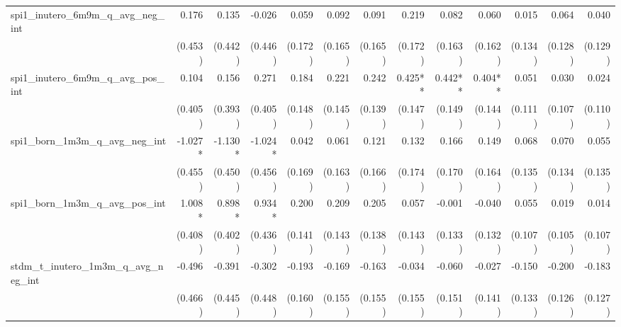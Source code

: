 \begin{tabular}{lrrrrrrrrrrrr}
spi1\_inutero\_6m9m\_q\_avg\_neg\_int       &        0.176 &        0.135 &       -0.026 &        0.059 &        0.092 &        0.091 &        0.219 &        0.082 &        0.060 &        0.015 &        0.064 &        0.040 \\ 
                                            &      (0.453) &      (0.442) &      (0.446) &      (0.172) &      (0.165) &      (0.165) &      (0.172) &      (0.163) &      (0.162) &      (0.134) &      (0.128) &      (0.129) \\ 
spi1\_inutero\_6m9m\_q\_avg\_pos\_int       &        0.104 &        0.156 &        0.271 &        0.184 &        0.221 &        0.242 &      0.425** &      0.442** &      0.404** &        0.051 &        0.030 &        0.024 \\ 
                                            &      (0.405) &      (0.393) &      (0.405) &      (0.148) &      (0.145) &      (0.139) &      (0.147) &      (0.149) &      (0.144) &      (0.111) &      (0.107) &      (0.110) \\ 
spi1\_born\_1m3m\_q\_avg\_neg\_int          &      -1.027* &      -1.130* &      -1.024* &        0.042 &        0.061 &        0.121 &        0.132 &        0.166 &        0.149 &        0.068 &        0.070 &        0.055 \\ 
                                            &      (0.455) &      (0.450) &      (0.456) &      (0.169) &      (0.163) &      (0.166) &      (0.174) &      (0.170) &      (0.164) &      (0.135) &      (0.134) &      (0.135) \\ 
spi1\_born\_1m3m\_q\_avg\_pos\_int          &       1.008* &       0.898* &       0.934* &        0.200 &        0.209 &        0.205 &        0.057 &       -0.001 &       -0.040 &        0.055 &        0.019 &        0.014 \\ 
                                            &      (0.408) &      (0.402) &      (0.436) &      (0.141) &      (0.143) &      (0.138) &      (0.143) &      (0.133) &      (0.132) &      (0.107) &      (0.105) &      (0.107) \\ 
stdm\_t\_inutero\_1m3m\_q\_avg\_neg\_int    &       -0.496 &       -0.391 &       -0.302 &       -0.193 &       -0.169 &       -0.163 &       -0.034 &       -0.060 &       -0.027 &       -0.150 &       -0.200 &       -0.183 \\ 
                                            &      (0.466) &      (0.445) &      (0.448) &      (0.160) &      (0.155) &      (0.155) &      (0.155) &      (0.151) &      (0.141) &      (0.133) &      (0.126) &      (0.127) \\ 

\end{tabular}
